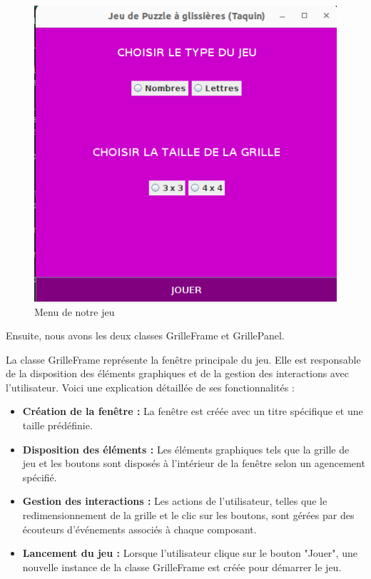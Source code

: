 \documentclass[a4paper,10pt]{article}
\begin{document}
\begin{figure}[H]
\centering
\includegraphics[scale=0.6]{captures/menu.png}
\caption{Menu de notre jeu}
\end{figure}

Ensuite, nous avons les deux classes GrilleFrame et GrillePanel.

La classe GrilleFrame représente la fenêtre principale du jeu. Elle est responsable de la disposition des éléments graphiques et de la gestion des interactions avec l'utilisateur. Voici une explication détaillée de ses fonctionnalités :

\begin{itemize}
\item \textbf{Création de la fenêtre :} La fenêtre est créée avec un titre spécifique et une taille prédéfinie.
\item \textbf{Disposition des éléments :} Les éléments graphiques tels que la grille de jeu et les boutons sont disposés à l'intérieur de la fenêtre selon un agencement spécifié.
\item \textbf{Gestion des interactions :} Les actions de l'utilisateur, telles que le redimensionnement de la grille et le clic sur les boutons, sont gérées par des écouteurs d'événements associés à chaque composant.
\item \textbf{Lancement du jeu :} Lorsque l'utilisateur clique sur le bouton "Jouer", une nouvelle instance de la classe GrilleFrame est créée pour démarrer le jeu.
\end{itemize}
\end{document}
